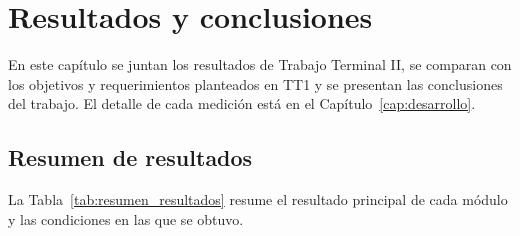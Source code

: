 \chapter{Resultados y conclusiones}
\label{cap:conclusiones}

En este capítulo se juntan los resultados de Trabajo Terminal II, se comparan con los
objetivos y requerimientos planteados en TT1 y se presentan las conclusiones del
trabajo. El detalle de cada medición está en el Capítulo~\ref{cap:desarrollo}.

\section{Resumen de resultados}

La Tabla~\ref{tab:resumen_resultados} resume el resultado principal de cada módulo y
las condiciones en las que se obtuvo.

